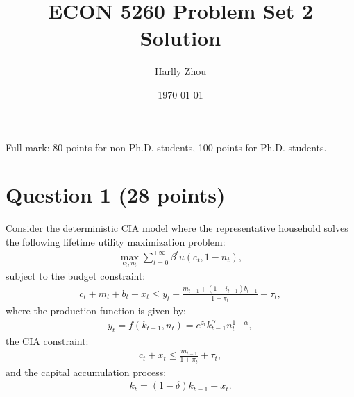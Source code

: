 \documentclass[12pt]{article}
\title{ECON 5260 Problem Set 2 Solution}
\author{Harlly Zhou}
\date{\today}
\begin{document}
\maketitle

Full mark: 80 points for non-Ph.D. students, 100 points for Ph.D. students.
\section*{Question 1 (28 points)}
Consider the deterministic CIA model where the representative household solves the following lifetime utility maximization problem:
\begin{align*}
    \max_{c_t, n_t} \sum_{t=0}^{+\infty} \beta^t u(c_t, 1-n_t),
\end{align*}
subject to the budget constraint:
\begin{align*}
    c_t + m_t + b_t + x_t \leq y_t + \frac{m_{t-1} + (1+i_{t-1}) b_{t-1}}{1+\pi_t} + \tau_t,
\end{align*}
where the production function is given by:
\begin{align*}
    y_t = f(k_{t-1}, n_t) = e^{z_t} k_{t-1}^{\alpha} n_t^{1-\alpha},
\end{align*}
the CIA constraint:
\begin{align*}
    c_t + x_t \leq \frac{m_{t-1}}{1+\pi_t} + \tau_t,
\end{align*}
and the capital accumulation process:
\begin{align*}
    k_t = (1-\delta) k_{t-1} + x_t.
\end{align*}
\end{document}
